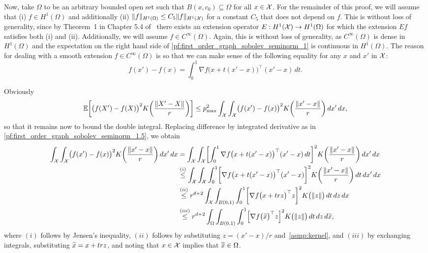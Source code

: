 Now, take $\Omega$ to be an arbitrary bounded open set such that $B(x,c_0) \subseteq \Omega$ for all $x \in \mathcal{X}$. For the remainder of this proof, we will assume that (i) $f \in H^1(\Omega)$ and additionally (ii) $\|f\|_{H^1(\Omega)} \leq C_5 \|f\|_{H^1(\mathcal{X})}$ for a constant $C_5$ that does not depend on $f$. This is without loss of generality, since by Theorem~1 in Chapter 5.4 of~\citet{evans10} there exists an extension operator $E: H^1(\mathcal{X}) \to H^1(\Omega)$ for which the extension $Ef$ satisfies both (i) and (ii). Additionally, we will assume $f \in C^{\infty}(\Omega)$. Again, this is without loss of generality, as $C^{\infty}(\Omega)$ is dense in $H^1(\Omega)$ and the expectation on the right hand side of \eqref{pf:first_order_graph_sobolev_seminorm_1} is continuous in $H^1(\Omega)$. The reason for dealing with a smooth extension $f \in C^{\infty}(\Omega)$ is so that we can make sense of the following equality for any $x$ and $x'$ in $\mathcal{X}$:
\begin{equation}
\label{pf:first_order_graph_sobolev_seminorm_1.5}
f(x') - f(x) = \int_{0}^{1} \nabla f\bigl(x + t(x' - x)\bigr)^{\top} (x' - x) \,dt.
\end{equation}

Obviously
\begin{equation}
\mathbb{E}\biggl[\bigl(f(X') - f(X)\bigr)^2K\biggl(\frac{\|X' - X\|}{r}\biggr)\biggr] \leq p_{\max}^2 \int_{\mathcal{X}} \int_{\mathcal{X}} \bigl(f(x') - f(x)\bigr)^2 K\biggl(\frac{\|x' - x\|}{r}\biggr) \,dx' \,dx, \label{pf:first_order_graph_sobolev_seminorm_2}
\end{equation}
so that it remains now to bound the double integral. Replacing difference by integrated derivative as in \eqref{pf:first_order_graph_sobolev_seminorm_1.5}, we obtain
\begin{align}
\int_{\mathcal{X}} \int_{\mathcal{X}} \bigl(f(x') - f(x)\bigr)^2 K\biggl(\frac{\|x' - x\|}{r}\biggr) \,dx' \,dx & = \int_{\mathcal{X}} \int_{\mathcal{X}} \biggl[\int_{0}^{1} \nabla f\bigl(x + t(x' - x)\bigr)^{\top} (x' - x)\,dt\biggr]^2 K\biggl(\frac{\|x' - x\|}{r}\biggr) \,dx' \,dx \nonumber \\
& \overset{(i)}{\leq} \int_{\mathcal{X}} \int_{\mathcal{X}} \int_{0}^{1} \biggl[\nabla f\bigl(x + t(x' - x)\bigr)^{\top} (x' - x)\biggr]^2 K\biggl(\frac{\|x' - x\|}{r}\biggr) \,dt\,dx' \,dx \nonumber \\
& \overset{(ii)}{\leq} r^{d + 2} \int_{\mathcal{X}} \int_{B(0,1)} \int_{0}^{1} \biggl[\nabla f\bigl(x + trz\bigr)^{\top} z\biggr]^2 K\bigl(\|z\|\bigr) \,dt\,dz \,dx \nonumber \\
&  \overset{(iii)}{\leq} r^{d + 2} \int_{\Omega} \int_{B(0,1)} \int_{0}^{1} \Bigl[\nabla f\bigl(\widetilde{x}\bigr)^{\top} z\Bigr]^2 K\bigl(\|z\|\bigr) \,dt \,dz \,d\widetilde{x}, \label{pf:first_order_graph_sobolev_seminorm_3} 
\end{align}
where $(i)$ follows by Jensen's inequality, $(ii)$ follows by substituting $z = (x' - x)/r$ and~\ref{asmp:kernel}, and $(iii)$ by exchanging integrals, substituting $\widetilde{x} = x + trz$, and noting that $x \in \mathcal{X}$ implies that $\widetilde{x} \in \Omega$.

